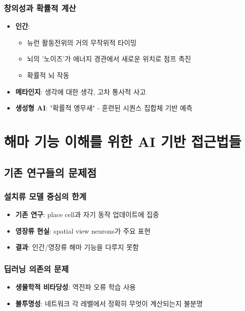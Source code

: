 \documentclass[openany]{book}
\begin{document}
\begin{appendices}
\subsubsection{창의성과 확률적 계산}
\begin{itemize}
\item \textbf{인간}: 
  \begin{itemize}
  \item 뉴런 활동전위의 거의 무작위적 타이밍
  \item 뇌의 '노이즈'가 에너지 경관에서 새로운 위치로 점프 촉진
  \item 확률적 뇌 작동
  \end{itemize}
\item \textbf{메타인지}: 생각에 대한 생각, 고차 통사적 사고
\item \textbf{생성형 AI}: "확률적 앵무새" - 훈련된 시퀀스 집합체 기반 예측
\end{itemize}

\section{해마 기능 이해를 위한 AI 기반 접근법들}

\subsection{기존 연구들의 문제점}

\subsubsection{설치류 모델 중심의 한계}
\begin{itemize}
\item \textbf{기존 연구}: place cell과 자기 동작 업데이트에 집중
\item \textbf{영장류 현실}: spatial view neurons가 주요 표현
\item \textbf{결과}: 인간/영장류 해마 기능을 다루지 못함
\end{itemize}

\subsubsection{딥러닝 의존의 문제}
\begin{itemize}
\item \textbf{생물학적 비타당성}: 역전파 오류 학습 사용
\item \textbf{불투명성}: 네트워크 각 레벨에서 정확히 무엇이 계산되는지 불분명
\end{itemize}


\end{appendices}
\end{document}
